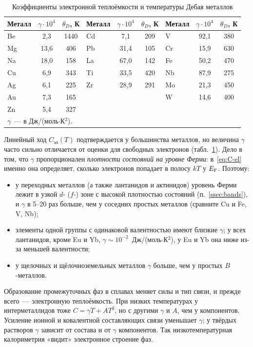 \begin{table}[ht]
\centering
\caption{Коэффициенты электронной теплоёмкости и температуры Дебая
металлов}\label{tab:gamma}
\small
\begin{tabular}{lcc@{\qquad}lcc@{\qquad}lcc}
\toprule
Металл & $\gamma\cdot10^4$ & $\theta_D$, К & Металл & $\gamma\cdot10^4$ & $\theta_D$, К & Металл & $\gamma\cdot10^4$ & $\theta_D$, К\\
\midrule
Be & 2,3 & 1440 & Cd & 7,1 & 209 & V & 92,1 & 380\\
Mg & 13,6 & 406 & Pb & 31,4 & 105 & Cr & 15,9 & 630\\
Na & 18,0 & 158 & La & 67,0 & 142 & Fe & 50,2 & 470\\
Cu & 6,9 & 343 & Ti & 33,5 & 420 & Nb & 87,9 & 275\\
Ag & 6,1 & 225 & Zr & 28,9 & 291 & Mo & 21,3 & 450\\
Au & 7,3 & 165 & & & & W & 14,6 & 400\\
Zn & 5,4 & 327 & & & & & & \\
\bottomrule
\multicolumn{9}{l}{\footnotesize $\gamma$~— в Дж/(моль$\cdot$К$^2$).}
\end{tabular}
\end{table}

Линейный ход $C_\text{эл}(T)$ подтверждается у большинства металлов, но
величина $\gamma$ часто сильно отличается от оценки для свободных
электронов (табл.~\ref{tab:gamma}). Дело в том, что $\gamma$ пропорционален
\emph{плотности состояний на уровне Ферми}: в~\eqref{eq:C-el} именно она
определяет, сколько электронов попадает в полосу $kT$ у $E_{\mathrm{F}}$. Поэтому:
\begin{itemize}
\item у переходных металлов (а также лантанидов и актинидов) уровень Ферми
лежит в узкой $d$- ($f$-) зоне с высокой плотностью состояний
(п.~\ref{ssec:bands}), и $\gamma$ в 5--20 раз больше, чем у соседних простых
металлов (сравните Cu и Fe, V, Nb);
\item элементы одной группы с одинаковой валентностью имеют близкие
$\gamma$; у всех лантанидов, кроме Eu и Yb, $\gamma\sim10^{-2}$~Дж/(моль$\cdot$К$^2$),
у Eu и Yb она ниже из-за меньшей валентности;
\item у щелочных и щёлочноземельных металлов $\gamma$ больше, чем у простых
$B$-металлов.
\end{itemize}
Образование промежуточных фаз в сплавах меняет силы и тип связи, и
прежде всего~— электронную теплоёмкость. При низких температурах у
интерметаллидов тоже $C=\gamma T+AT^3$, но с другими $\gamma$ и $A$, чем у
компонентов. Усиление ионной и ковалентной составляющих связи уменьшает
$\gamma$; у твёрдых растворов $\gamma$ зависит от состава и от $\gamma$
компонентов. Так низкотемпературная калориметрия «видит» электронное
строение фаз.

